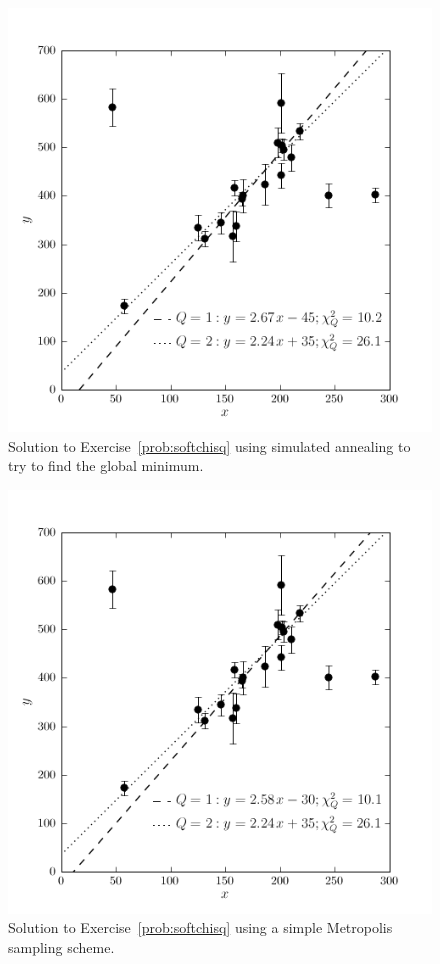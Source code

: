 \documentclass[12pt,twoside]{article}
\newcommand{\problemname}{Exercise}
\newcounter{problem}
\begin{document}
\clearpage
\begin{figure}[H]
\includegraphics[]{ex7c.png}
\caption{Solution to \problemname~\ref{prob:softchisq} using simulated annealing to try to find the global minimum.}\label{fig:softchisqc}
\end{figure}
\clearpage
\begin{figure}[H]
\includegraphics[]{ex7d.png}
\caption{Solution to \problemname~\ref{prob:softchisq} using a simple Metropolis sampling scheme.}\label{fig:softchisqd}
\end{figure}
\end{document}
